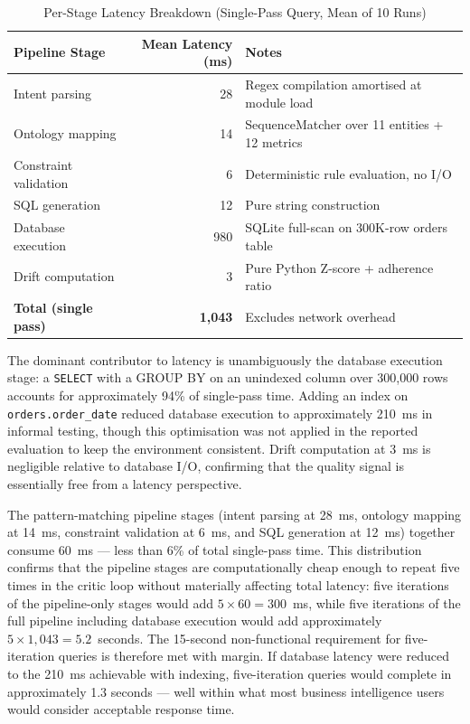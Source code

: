 \documentclass[12pt,a4paper]{report}
\begin{document}
\begin{table}[H]
  \centering
  \caption{Per-Stage Latency Breakdown (Single-Pass Query, Mean of 10 Runs)}
  \label{tab:latency-breakdown}
  \renewcommand{\arraystretch}{1.2}
  \begin{tabularx}{\textwidth}{@{}lrl@{}}
    \toprule
    \textbf{Pipeline Stage} & \textbf{Mean Latency (ms)} & \textbf{Notes} \\
    \midrule
    Intent parsing          &  28  & Regex compilation amortised at module load \\
    Ontology mapping        &  14  & SequenceMatcher over 11 entities + 12 metrics \\
    Constraint validation   &   6  & Deterministic rule evaluation, no I/O \\
    SQL generation          &  12  & Pure string construction \\
    Database execution      & 980  & SQLite full-scan on 300K-row orders table \\
    Drift computation       &   3  & Pure Python Z-score + adherence ratio \\
    \midrule
    \textbf{Total (single pass)} & \textbf{1,043} & Excludes network overhead \\
    \bottomrule
  \end{tabularx}
\end{table}

The dominant contributor to latency is unambiguously the database execution stage: a \texttt{SELECT} with a GROUP BY on an unindexed column over 300,000 rows accounts for approximately 94\% of single-pass time. Adding an index on \texttt{orders.order\_date} reduced database execution to approximately 210~ms in informal testing, though this optimisation was not applied in the reported evaluation to keep the environment consistent. Drift computation at 3~ms is negligible relative to database I/O, confirming that the quality signal is essentially free from a latency perspective.

The pattern-matching pipeline stages (intent parsing at 28~ms, ontology mapping at 14~ms, constraint validation at 6~ms, and SQL generation at 12~ms) together consume 60~ms — less than 6\% of total single-pass time. This distribution confirms that the pipeline stages are computationally cheap enough to repeat five times in the critic loop without materially affecting total latency: five iterations of the pipeline-only stages would add $5 \times 60 = 300$~ms, while five iterations of the full pipeline including database execution would add approximately $5 \times 1,043 = 5.2$~seconds. The 15-second non-functional requirement for five-iteration queries is therefore met with margin. If database latency were reduced to the 210~ms achievable with indexing, five-iteration queries would complete in approximately 1.3 seconds — well within what most business intelligence users would consider acceptable response time.
\end{document}

